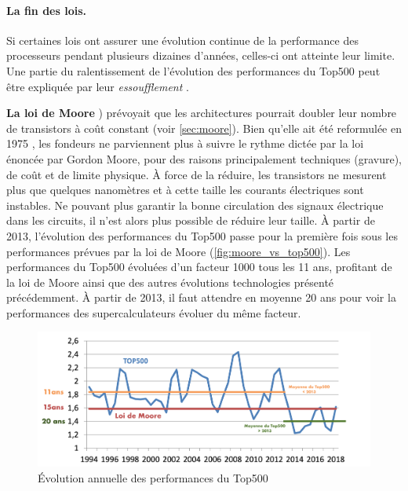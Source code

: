         \paragraph{La fin des lois.} Si certaines lois ont assurer une évolution continue de la performance des processeurs pendant plusieurs dizaines d'années, celles-ci ont atteinte leur limite. Une partie du ralentissement de l'évolution des performances du Top500 peut être expliquée par leur \textit{essoufflement} \cite{FrancoisBodin2015}.
            
                
                \textbf{La loi de Moore} \cite{Moore1998}) prévoyait que les architectures pourrait doubler leur nombre de transistors à coût constant (voir \autoref{sec:moore}). Bien qu'elle ait été reformulée en 1975 \cite{Moore75}, les fondeurs ne parviennent plus à suivre le rythme dictée par la loi énoncée par Gordon Moore, pour des raisons principalement techniques (gravure), de coût \cite{Brooks2017} et de limite physique. À force de la réduire, les transistors ne mesurent plus que quelques nanomètres et à cette taille les courants électriques sont instables. Ne pouvant plus garantir la bonne circulation des signaux électrique dans les circuits, il n’est alors plus possible de réduire leur taille.
                À partir de 2013, l'évolution des performances du Top500 passe pour la première fois sous les performances prévues par la loi de Moore (\autoref{fig:moore_vs_top500}). Les performances du Top500 évoluées d'un facteur 1000 tous les 11 ans, profitant de la loi de Moore ainsi que des autres évolutions technologies présenté précédemment. À partir de 2013, il faut attendre en moyenne 20 ans pour voir la performances des supercalculateurs évoluer du même facteur.
                
                \begin{figure}
                \center
                \includegraphics[width=12cm]{images/moore_vs_top500.png}
                \caption{\label{fig:moore_vs_top500} Évolution annuelle des performances du Top500\protect\footnotemark}
                    \end{figure}
        
